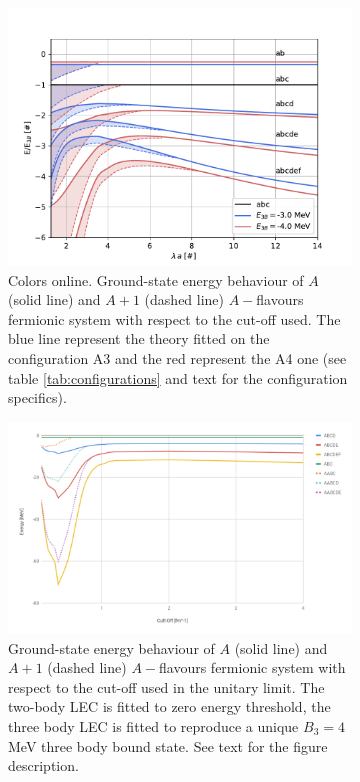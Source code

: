 \documentclass[preprint,12pt]{elsarticle}
\begin{document}
\begin{figure}
    \centering
    \begin{subfigure}[t]{0.45\textwidth}
        \centering
        \includegraphics[width=\linewidth]{./p-systems-vs-l} 
        \caption{Colors online. Ground-state energy behaviour of $A$ (solid line) and $A+1$ (dashed line) $A-$flavours fermionic system with respect to the cut-off used. The blue line represent the theory fitted on the configuration A3 and the red represent the A4 one (see table \ref{tab:configurations} and text for the configuration specifics). }
        \label{fig:treshold}
    \end{subfigure}
    \hfill
    \begin{subfigure}[t]{0.45\textwidth}
        \centering
        \includegraphics[width=\linewidth]{./unitarity_chart} 
        \caption{Ground-state energy behaviour of $A$ (solid line) and $A+1$ (dashed line) $A-$flavours fermionic system with respect to the cut-off used in the unitary limit. The two-body LEC is fitted to zero energy threshold, the three body LEC is fitted to reproduce a unique $B_3=4$ MeV three body bound state. See text for the figure description.}  
        \label{fig:unitary}
    \end{subfigure}
\caption{}
\end{figure} 
\end{document}
